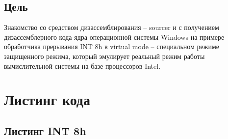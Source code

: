 \subsection*{Цель}

Знакомство со средством дизассемблирования – sourcer и с
получением дизассемблерного кода ядра операционной системы Windows на примере обработчика прерывания INT 8h в virtual mode – специальном режиме защищенного режима, который эмулирует реальный режим работы вычислительной системы на базе процессоров Intel.

\section*{Листинг кода}

\subsection*{Листинг INT 8h}


